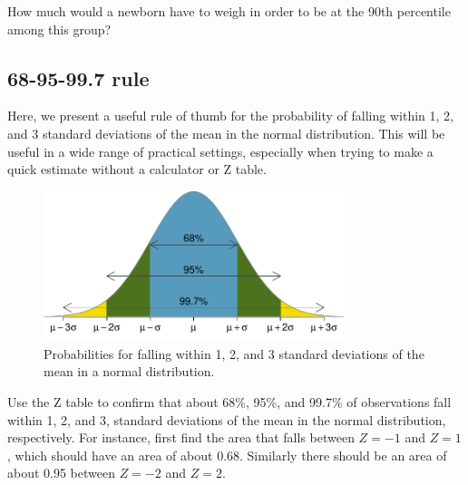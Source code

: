 \begin{exercisewrap}
\begin{nexercise}How much would a newborn have to weigh in order to be at the 90th percentile among this group?\footnotemark
\end{nexercise}
\end{exercisewrap}

\subsection{68-95-99.7 rule}

Here, we present a useful rule of thumb for the probability of falling within 1, 2, and 3 standard deviations of the mean in the normal distribution. This will be useful in a wide range of practical settings, especially when trying to make a quick estimate without a calculator or Z table.

\begin{figure}[hht]
\centering
\includegraphics[width=0.78\textwidth]{ch_distributions/figures/6895997/6895997}
\caption{Probabilities for falling within 1, 2, and 3 standard deviations of the mean in a normal distribution.}
\label{6895997}
\end{figure}

\begin{exercisewrap}
\begin{nexercise}
Use the Z table to confirm that about 68\%, 95\%, and 99.7\% of observations fall within 1, 2, and 3, standard deviations of the mean in the normal distribution, respectively. For instance, first find the area that falls between $Z=-1$ and $Z=1$, which should have an area of about 0.68. Similarly there should be an area of about 0.95 between $Z=-2$ and $Z=2$.\footnotemark\end{nexercise}
\end{exercisewrap}


